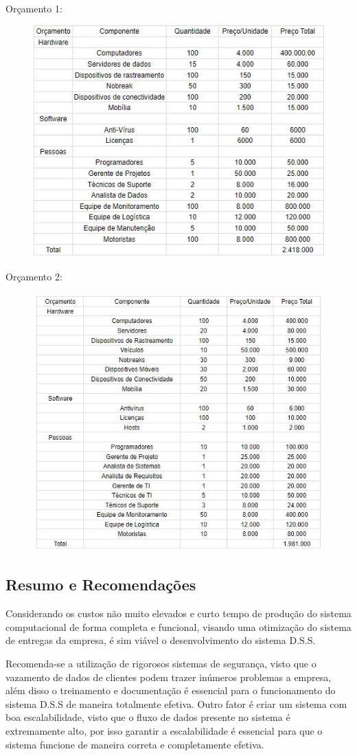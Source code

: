 		Orçamento 1:
		\begin{figure}[H]
			\centering
			\includegraphics[width=0.7\linewidth]{Pictures/Orc}
			\caption{}
			\label{fig:orc}
		\end{figure}
	
		Orçamento 2:
		\begin{figure}
			\centering
			\includegraphics[width=0.7\linewidth]{Pictures/Orc2}
			\caption{}
			\label{fig:orc2}
		\end{figure}

       \subsection{Resumo e Recomenda\c{c}\~{o}es}

       Considerando os custos não muito elevados e curto tempo de produção do sistema computacional de forma completa e funcional, visando uma otimização do sistema de entregas da empresa, é sim viável o desenvolvimento do sistema D.S.S.
       
       Recomenda-se a utilização de rigorosos sistemas de segurança, visto que o vazamento de dados de clientes podem trazer inúmeros problemas a empresa, além disso o treinamento e documentação é essencial para o funcionamento do sistema D.S.S de maneira totalmente efetiva. Outro fator é criar um sistema com boa escalabilidade, visto que o fluxo de dados presente no sistema é extremamente alto, por isso garantir a escalabilidade é essencial para que o sistema funcione de maneira correta e completamente efetiva.
